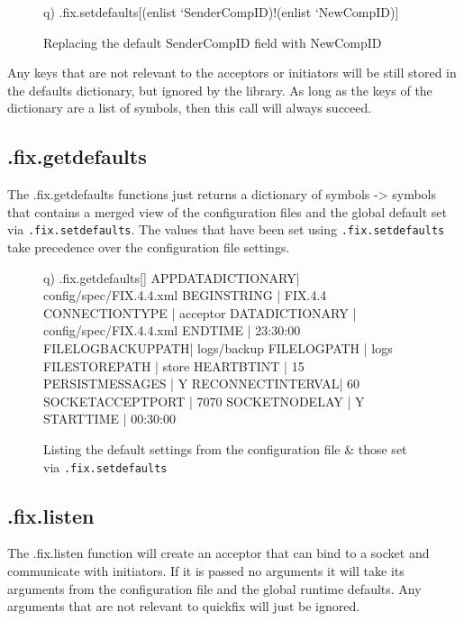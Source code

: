 \begin{figure}[H]
\begin{qcode}
q) .fix.setdefaults[(enlist `SenderCompID)!(enlist `NewCompID)]
\end{qcode}
\caption{Replacing the default SenderCompID field with NewCompID}
\end{figure}

Any keys that are not relevant to the acceptors or initiators will be still stored in
the defaults dictionary, but ignored by the library. As long as the keys of the dictionary are a list of symbols, then this call will always succeed. 

\subsection{.fix.getdefaults}
\label{func:getdefaults}

The .fix.getdefaults functions just returns a dictionary of symbols -> symbols that contains a merged view of the configuration files and the global default set via \texttt{.fix.setdefaults}. The values that have been set using \texttt{.fix.setdefaults} take precedence over the configuration file settings.

\begin{figure}[H]
\begin{qcode}
q) .fix.getdefaults[]
APPDATADICTIONARY| config/spec/FIX.4.4.xml
BEGINSTRING      | FIX.4.4
CONNECTIONTYPE   | acceptor
DATADICTIONARY   | config/spec/FIX.4.4.xml
ENDTIME          | 23:30:00
FILELOGBACKUPPATH| logs/backup
FILELOGPATH      | logs
FILESTOREPATH    | store
HEARTBTINT       | 15
PERSISTMESSAGES  | Y
RECONNECTINTERVAL| 60
SOCKETACCEPTPORT | 7070
SOCKETNODELAY    | Y
STARTTIME        | 00:30:00
\end{qcode}
\caption{Listing the default settings from the configuration file \& those set via \texttt{.fix.setdefaults}}
\end{figure}

\subsection{.fix.listen}
\label{func:listen}

The .fix.listen function will create an acceptor that can bind to a socket and communicate with initiators. If it is passed no arguments it will take its arguments from the configuration file
and the global runtime defaults. Any arguments that are not relevant to quickfix will just be
ignored.

